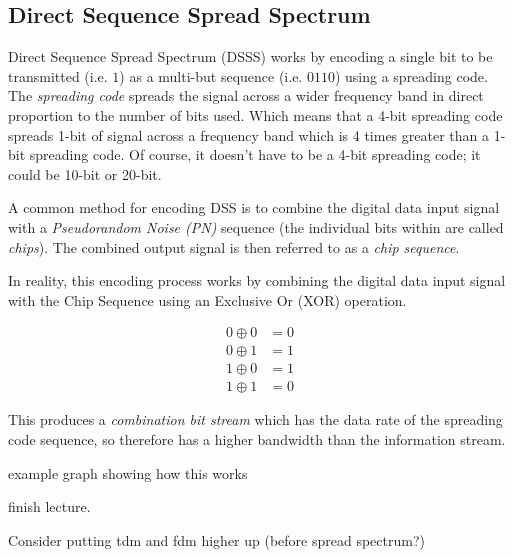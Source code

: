 \subsection{Direct Sequence Spread Spectrum}
Direct Sequence Spread Spectrum (DSSS) works by encoding a single bit to be transmitted (i.e. $1$) as a multi-but sequence (i.e. $0110$) using a spreading code. The \textit{spreading code} spreads the signal across a wider frequency band in direct proportion to the number of bits used. Which means that a 4-bit spreading code spreads 1-bit of signal across a frequency band which is 4 times greater than a 1-bit spreading code. Of course, it doesn't have to be a 4-bit spreading code; it could be 10-bit or 20-bit. 

A common method for encoding DSS is to combine the digital data input signal with a \textit{Pseudorandom Noise (PN)} sequence (the individual bits within are called \textit{chips}). The combined output signal is then referred to as a \textit{chip sequence}.

In reality, this encoding process works by combining the digital data input signal with the Chip Sequence using an Exclusive Or (XOR) operation. 

\begin{align*}
    0 \oplus 0 &= 0\\
    0 \oplus 1 &= 1\\
    1 \oplus 0 &= 1\\
    1 \oplus 1 &= 0
\end{align*}

This produces a \textit{combination bit stream} which has the data rate of the spreading code sequence, so therefore has a higher bandwidth than the information stream. 

\begin{todo}
example graph showing how this works
\end{todo}

\begin{todo}
    finish lecture.

    Consider putting tdm and fdm higher up (before spread spectrum?)
\end{todo}
